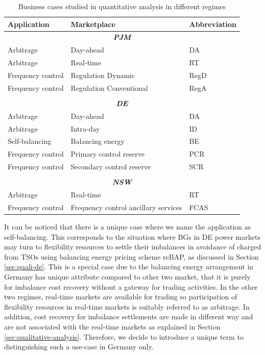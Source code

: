 \begin{table}[h!]
	\small
	\centering
	\begin{tabular}{l l l}
		\hline
		\textbf{Application}  & \textbf{Marketplace} & \textbf{Abbreviation}\\
		\hline
		\multicolumn{3}{c}{\textit{\textbf{PJM}}}\\
		Arbitrage & Day-ahead & DA \\
		Arbitrage & Real-time & RT \\
		Frequency control & Regulation Dynamic & RegD \\
		Frequency control & Regulation Conventional & RegA \\
		&&\\
		\multicolumn{3}{c}{\textit{\textbf{DE}}}\\
		Arbitrage & Day-ahead & DA \\
		Arbitrage & Intra-day & ID \\
		Self-balancing & Balancing energy & BE \\
		Frequency control & Primary control reserve & PCR \\
		Frequency control & Secondary control reserve & SCR \\
		&&\\
		\multicolumn{3}{c}{\textit{\textbf{NSW}}}\\
		Arbitrage & Real-time & RT \\
		Frequency control & Frequency control ancillary services & FCAS \\
		\hline
	\end{tabular}
\caption{Business cases studied in quantitative analysis in different regimes}\label{tab:biz-cases}
\end{table}

It can be noticed that there is a unique case where we name the application as self-balancing. This corresponds to the situation where BGs in DE power markets may turn to flexibility resources to settle their imbalances in avoidance of charged from TSOs using balancing energy pricing scheme reBAP, as discussed in Section \ref{sec:quali-de}. This is a special case due to the balancing energy arrangement in Germany has unique attribute compared to other two market, that it is purely for imbalance cost recovery without a gateway for trading activities. In the other two regimes, real-time markets are available for trading so participation of flexibility resources in real-time markets is suitably referred to as arbitrage. In addition, cost recovery for imbalance settlements are made in different way and are not associated with the real-time markets as explained in Section \ref{sec:qualitative-analysis}. Therefore, we decide to introduce a unique term to distinguishing such a use-case in Germany only.

